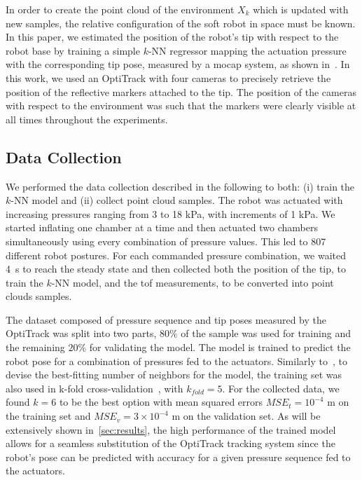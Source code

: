 In order to create the point cloud of the environment $X_k$ which is updated with new samples, the relative configuration of the soft robot in space must be known. In this paper, we estimated the position of the robot's tip with respect to the robot base by training a simple $k$-NN regressor mapping the actuation pressure with the corresponding tip pose, measured by a \gls{mocap} system, as shown in~\cite{ouyang2022modular}. In this work, we used an OptiTrack with four cameras to precisely retrieve the position of the reflective markers attached to the tip. The position of the cameras with respect to the environment was such that the markers were clearly visible at all times throughout the experiments.

\subsection{Data Collection}
We performed the data collection described in the following to both: (i) train the $k$-NN model and (ii) collect point cloud samples.
The robot was actuated with increasing pressures ranging from 3 to 18 kPa, with increments of 1 kPa. We started inflating one chamber at a time and then actuated two chambers simultaneously using every combination of pressure values. This led to 807 different robot postures. For each commanded pressure combination, we waited \SI{4}{\second} to reach the steady state and then collected both the position of the tip, to train the $k$-NN model, and the \gls{tof} measurements, to be converted into point clouds samples.

%

The dataset composed of pressure sequence and tip poses measured by the OptiTrack was split into two parts, $80\%$ of the sample was used for training and the remaining $20\%$ for validating the model. The model is trained to predict the robot pose for a combination of pressures fed to the actuators. Similarly to~\cite{ouyang2022modular}, to devise the best-fitting number of neighbors for the model, the training set was also used in k-fold cross-validation~\cite{kohavi1995study}, with $k_{fold} = 5$. For the collected data, we found $k=6$ to be the best option with mean squared errors $MSE_t = 10^{-4}$ m on the training set and $MSE_v = 3\times10^{-4}$ m on the validation set. As will be extensively shown in~\cref{sec:results}, the high performance of the trained model allows for a seamless substitution of the OptiTrack tracking system since the robot's pose can be predicted with accuracy for a given pressure sequence fed to the actuators. 

